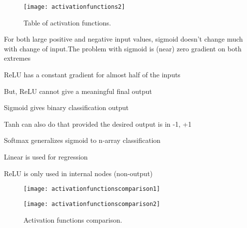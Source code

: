  	\begin{figure}[htb]
		\centering
		\texttt{[image: activationfunctions2]}
		\caption[Table of activation functions]{Table of activation functions.}
		\label{fig:activationfunctions2}
	\end{figure}


	\begin{bulletedlist}
		\item For both large positive and negative input values, sigmoid doesn't change much with change of input.The problem with sigmoid is (near) zero gradient on both extremes
		\item ReLU has a constant gradient for almost half of the inputs
		\item But, ReLU cannot give a meaningful final output
		\item Sigmoid gives binary classification output
		\item Tanh can also do that provided the desired output is in {-1, +1}
		\item Softmax generalizes sigmoid to n-array classification
		\item Linear is used for regression
		\item ReLU is only used in internal nodes (non-output)
	\end{bulletedlist}



 	\begin{figure}[htb]
		\begin{minipage}[t]{0.48\textwidth}
			\centering
			\texttt{[image: activationfunctionscomparison1]}
		\end{minipage}
		\hfill
		\begin{minipage}[t]{0.48\textwidth}
			\centering
			\texttt{[image: activationfunctionscomparison2]}
		\end{minipage}
		\caption[Activation functions comparison]{Activation functions comparison.}
		\label{fig:activationfunctionscomparison}
	\end{figure}


